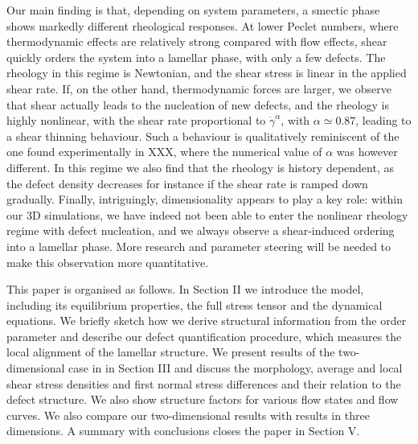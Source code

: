 \documentclass[8.5pt,twoside,twocolumn]{article}
\begin{document}


Our main finding is that, depending on system parameters, a smectic phase
shows markedly different rheological responses. At lower Peclet
numbers, where thermodynamic effects are relatively strong compared with
flow effects,  shear quickly orders the system into a lamellar phase,
with only a few defects. The rheology in this regime is Newtonian, and
the shear stress is linear in the applied shear rate.
If, on the other hand, thermodynamic forces are larger, we observe that shear actually leads to the nucleation of new defects, and the rheology is highly nonlinear, with the shear rate proportional to $\dot{\gamma}^{\alpha}$, with $\alpha\simeq 0.87$, leading to a shear thinning behaviour. Such a behaviour is qualitatively reminiscent of the one found experimentally in XXX, where the numerical value of $\alpha$ was however different. In this regime we also find that the rheology is history dependent, as the defect density decreases for instance if the shear rate is ramped down gradually. Finally, intriguingly, dimensionality appears to play a key role: within our 3D simulations, we have indeed not been able to enter the nonlinear rheology regime with defect nucleation, and we always observe a shear-induced ordering into a lamellar phase. More research and parameter steering will be needed to make this observation more quantitative.
 
This paper is organised as follows. In Section II we introduce the model,
including its equilibrium properties, the full stress tensor and the
dynamical equations. We briefly sketch how we derive structural information
from the order parameter and describe our defect quantification procedure,
which measures the local alignment of the lamellar structure.
We present results of the two-dimensional case in in Section III and
discuss the morphology, average and local shear stress densities and
first normal stress differences and their relation to the defect structure.
We also show structure factors for various flow states and flow curves.
We also compare our two-dimensional results with results in three dimensions. 
A summary with conclusions closes the paper in Section V.
\end{document}
